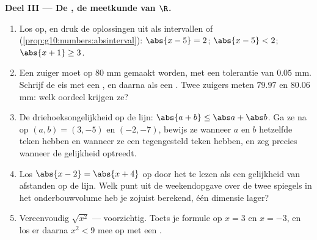 \begin{problem}
\medskip
\noindent\textbf{Deel III --- De , de meetkunde van $\R$.}
\begin{enumerate}[resume]
  \item Los op, en druk de oplossingen uit als intervallen of 
        (\cref{prop:g10:numbers:absinterval}): $\abs{x - 5} = 2$; \quad
        $\abs{x - 5} < 2$; \quad $\abs{x + 1} \geq 3$.
  \item Een zuiger moet op $80$ mm gemaakt worden, met een tolerantie van
        $0.05$ mm. Schrijf de eis met een , en daarna als een
        . Twee zuigers meten $79.97$ en $80.06$ mm: welk oordeel
        krijgen ze?
  \item De driehoeksongelijkheid op de lijn:
        $\abs{a + b} \leq \abs a + \abs b$. Ga ze na op $(a, b) = (3, -5)$ en
        $(-2, -7)$, bewijs ze wanneer $a$ en $b$ hetzelfde teken hebben en
        wanneer ze een tegengesteld teken hebben, en zeg precies wanneer de
        gelijkheid optreedt.
  \item Los $\abs{x - 2} = \abs{x + 4}$ op door het te lezen als een
        gelijkheid van afstanden op de lijn. Welk punt uit de weekendopgave
        over de twee spiegels in het onderbouwvolume heb je zojuist berekend,
        één dimensie lager?
  \item Vereenvoudig $\sqrt{x^2}$ --- voorzichtig. Toets je formule op
        $x = 3$ en $x = -3$, en los er daarna $x^2 < 9$ mee op met een
        .
\end{enumerate}


\end{problem}
